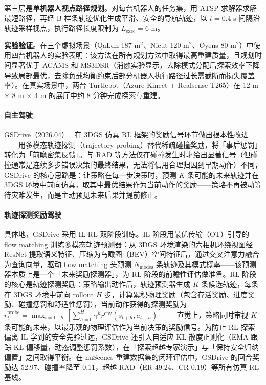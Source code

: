 第三层是\textbf{单机器人视点路径规划}。对每台机器人的任务集，用 ATSP 求解器求解最短路径，再经 B 样条轨迹优化生成平滑、安全的导航轨迹，以 $t=0.4$ s 间隔沿轨迹采样视点，执行路径长度限制为 $L_\text{exec}=6$ m。

\textbf{实验验证}。在三个虚拟场景（QaLdn 187 m$^2$、Nicut 120 m$^2$、Oyens 80 m$^2$）中使用四台机器人的实验表明：该方法在所有规划方法中取得最高重建质量，且规划时间显著优于 ACAMS 和 MS3DSR（消融实验显示，去除模式分配后探索效率下降导致局部最优，去除负载均衡约束后部分机器人执行路径过长需截断而损失覆盖率）。在真实场景中，两台 Turtlebot（Azure Kinect + Realsense T265）在 12 m $\times$ 8 m $\times$ 4 m 的展厅中约 8 分钟完成探索与重建。

\paragraph{自主驾驶}

GSDrive（2026.04）~\cite{2604_28111} 在 3DGS 仿真 RL 框架的奖励信号环节做出根本性改进——用多模态轨迹探测（trajectory probing）替代稀疏碰撞奖励，将「事后惩罚」转化为「前瞻密集反馈」。与 RAD 等方法仅在碰撞发生时才给出显著信号（但碰撞通常是连续多步错误决策的最终结果，无法将信用合理归因到早期动作）不同，GSDrive 的核心思路是：让策略在每一步决策时，预测 $K$ 条可能的未来轨迹并在 3DGS 环境中前向仿真，取其中最优结果作为当前动作的奖励——策略不再被动等待灾难发生，而是主动预见未来后果并提前修正。

\paragraph{轨迹探测奖励驾驶}

具体地，GSDrive 采用 IL-RL 双阶段训练。IL 阶段用最优传输（OT）引导的 flow matching 训练多模态轨迹预测器：从 3DGS 环境渲染的六相机环绕视图经 ResNet 提取语义特征、压缩为鸟瞰图（BEV）空间特征后，通过交叉注意力融合为查询向量，驱动 flow matching 头预测 $N_{\text{modes}}$ 条轨迹及其模式概率——该预测器本质上是一个「未来奖励探测器」，为 RL 阶段的前瞻性评估做准备。RL 阶段的核心是轨迹探测奖励：策略输出动作后，轨迹预测器生成 $K$ 条候选轨迹，每条在 3DGS 环境中前向 rollout $H$ 步，计算累积物理奖励（包含存活奖励、进度奖励、碰撞惩罚和舒适性惩罚），当前动作获得的探测奖励为 $r_{t}^{\text{probe}} = \max_{i=1\ldots K}[\sum_{h=0}^{H}\gamma^{h}r^{\text{env}}(s_{t+h},a_{t+h})]$——直觉上，策略同时审视 $K$ 条可能的未来，以最乐观的物理评估作为当前决策的奖励信号。为防止 RL 探索偏离 IL 学到的安全先验过远，GSDrive 还引入自适应 KL 散度正则化（EMA 跟踪 KL 偏移量，动态调整惩罚系数），在「探索超越专家演示」与「保持安全归纳偏置」之间取得平衡。在 nuScenes 重建数据集的闭环评估中，GSDrive 的回合奖励达 52.97、碰撞率降至 0.11，超越 RAD（ER 49.24、CR 0.19）等所有仿真 RL 基线。


